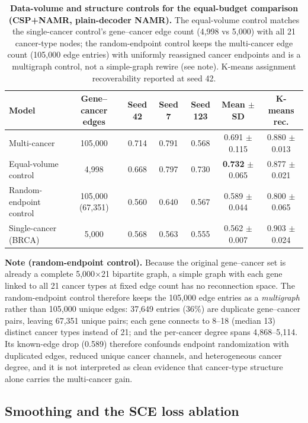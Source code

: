 \documentclass[11pt,a4paper]{article}
\begin{document}
\begin{table}[H]
\centering
\caption{\textbf{Data-volume and structure controls for the equal-budget comparison (CSP+NAMR, plain-decoder NAMR).} The equal-volume control matches the single-cancer control's gene--cancer edge count (4,998 vs 5,000) with all 21 cancer-type nodes; the random-endpoint control keeps the multi-cancer edge count (105,000 edge entries) with uniformly reassigned cancer endpoints and is a multigraph control, not a simple-graph rewire (see note). K-means assignment recoverability reported at seed 42.}
\label{tab:s13}
\footnotesize
\begin{tabular}{@{}lcccccc@{}}
\toprule
\textbf{Model} & \textbf{Gene--cancer edges} & \textbf{Seed 42} & \textbf{Seed 7} & \textbf{Seed 123} & \textbf{Mean $\pm$ SD} & \textbf{K-means rec.} \\
\midrule
Multi-cancer & 105,000 & 0.714 & 0.791 & 0.568 & 0.691 $\pm$ 0.115 & 0.880 $\pm$ 0.013 \\
Equal-volume control & 4,998 & 0.668 & 0.797 & 0.730 & \textbf{0.732} $\pm$ 0.065 & 0.877 $\pm$ 0.021 \\
Random-endpoint control & 105,000 (67,351) & 0.560 & 0.640 & 0.567 & 0.589 $\pm$ 0.044 & 0.800 $\pm$ 0.065 \\
Single-cancer (BRCA) & 5,000 & 0.568 & 0.563 & 0.555 & 0.562 $\pm$ 0.007 & 0.903 $\pm$ 0.024 \\
\bottomrule
\end{tabular}

\noindent \textbf{Note (random-endpoint control).} Because the original gene--cancer set is already a complete 5{,}000$\times$21 bipartite graph, a simple graph with each gene linked to all 21 cancer types at fixed edge count has no reconnection space. The random-endpoint control therefore keeps the 105{,}000 edge entries as a \textit{multigraph} rather than 105{,}000 unique edges: 37{,}649 entries (36\%) are duplicate gene--cancer pairs, leaving 67{,}351 unique pairs; each gene connects to 8--18 (median 13) distinct cancer types instead of 21; and the per-cancer degree spans 4{,}868--5{,}114. Its known-edge drop (0.589) therefore confounds endpoint randomization with duplicated edges, reduced unique cancer channels, and heterogeneous cancer degree, and it is not interpreted as clean evidence that cancer-type structure alone carries the multi-cancer gain.
\end{table}

\FloatBarrier


\subsection{Smoothing and the SCE loss ablation}
\end{document}

